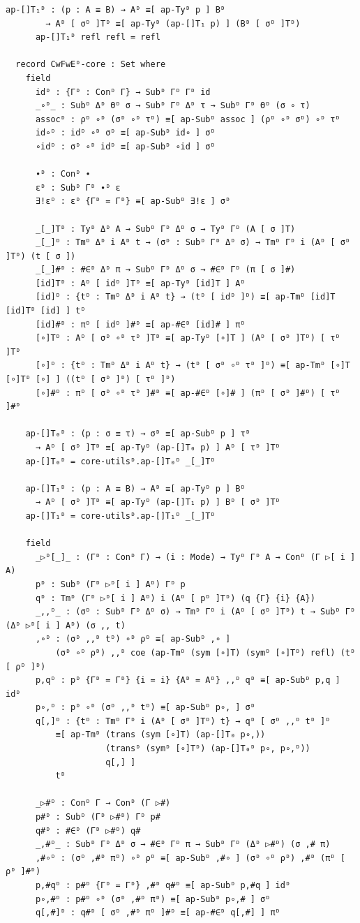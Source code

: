 \documentclass[10pt,a4paper]{article}
\theoremstyle{definition}
\theoremstyle{remark}
\begin{document}
{\begin{Verbatim}[breaklines=true,breakanywhere=true,fontsize=\scriptsize]
      ap-[]T₁ᴰ : (p : A ≡ B) → Aᴰ ≡[ ap-Tyᴰ p ] Bᴰ
        → Aᴰ [ σᴰ ]Tᴰ ≡[ ap-Tyᴰ (ap-[]T₁ p) ] (Bᴰ [ σᴰ ]Tᴰ)
      ap-[]T₁ᴰ refl refl = refl

  record CwFwEᴰ-core : Set where
    field
      idᴰ : {Γᴰ : Conᴰ Γ} → Subᴰ Γᴰ Γᴰ id
      _∘ᴰ_ : Subᴰ Δᴰ Θᴰ σ → Subᴰ Γᴰ Δᴰ τ → Subᴰ Γᴰ Θᴰ (σ ∘ τ)
      assocᴰ : ρᴰ ∘ᴰ (σᴰ ∘ᴰ τᴰ) ≡[ ap-Subᴰ assoc ] (ρᴰ ∘ᴰ σᴰ) ∘ᴰ τᴰ
      id∘ᴰ : idᴰ ∘ᴰ σᴰ ≡[ ap-Subᴰ id∘ ] σᴰ
      ∘idᴰ : σᴰ ∘ᴰ idᴰ ≡[ ap-Subᴰ ∘id ] σᴰ

      ∙ᴰ : Conᴰ ∙
      εᴰ : Subᴰ Γᴰ ∙ᴰ ε
      ∃!εᴰ : εᴰ {Γᴰ = Γᴰ} ≡[ ap-Subᴰ ∃!ε ] σᴰ

      _[_]Tᴰ : Tyᴰ Δᴰ A → Subᴰ Γᴰ Δᴰ σ → Tyᴰ Γᴰ (A [ σ ]T)
      _[_]ᴰ : Tmᴰ Δᴰ i Aᴰ t → (σᴰ : Subᴰ Γᴰ Δᴰ σ) → Tmᴰ Γᴰ i (Aᴰ [ σᴰ ]Tᴰ) (t [ σ ])
      _[_]#ᴰ : #∈ᴰ Δᴰ π → Subᴰ Γᴰ Δᴰ σ → #∈ᴰ Γᴰ (π [ σ ]#)
      [id]Tᴰ : Aᴰ [ idᴰ ]Tᴰ ≡[ ap-Tyᴰ [id]T ] Aᴰ
      [id]ᴰ : {tᴰ : Tmᴰ Δᴰ i Aᴰ t} → (tᴰ [ idᴰ ]ᴰ) ≡[ ap-Tmᴰ [id]T [id]Tᴰ [id] ] tᴰ
      [id]#ᴰ : πᴰ [ idᴰ ]#ᴰ ≡[ ap-#∈ᴰ [id]# ] πᴰ
      [∘]Tᴰ : Aᴰ [ σᴰ ∘ᴰ τᴰ ]Tᴰ ≡[ ap-Tyᴰ [∘]T ] (Aᴰ [ σᴰ ]Tᴰ) [ τᴰ ]Tᴰ
      [∘]ᴰ : {tᴰ : Tmᴰ Δᴰ i Aᴰ t} → (tᴰ [ σᴰ ∘ᴰ τᴰ ]ᴰ) ≡[ ap-Tmᴰ [∘]T [∘]Tᴰ [∘] ] ((tᴰ [ σᴰ ]ᴰ) [ τᴰ ]ᴰ)
      [∘]#ᴰ : πᴰ [ σᴰ ∘ᴰ τᴰ ]#ᴰ ≡[ ap-#∈ᴰ [∘]# ] (πᴰ [ σᴰ ]#ᴰ) [ τᴰ ]#ᴰ

    ap-[]T₀ᴰ : (p : σ ≡ τ) → σᴰ ≡[ ap-Subᴰ p ] τᴰ
      → Aᴰ [ σᴰ ]Tᴰ ≡[ ap-Tyᴰ (ap-[]T₀ p) ] Aᴰ [ τᴰ ]Tᴰ
    ap-[]T₀ᴰ = core-utilsᴰ.ap-[]T₀ᴰ _[_]Tᴰ

    ap-[]T₁ᴰ : (p : A ≡ B) → Aᴰ ≡[ ap-Tyᴰ p ] Bᴰ
      → Aᴰ [ σᴰ ]Tᴰ ≡[ ap-Tyᴰ (ap-[]T₁ p) ] Bᴰ [ σᴰ ]Tᴰ
    ap-[]T₁ᴰ = core-utilsᴰ.ap-[]T₁ᴰ _[_]Tᴰ

    field
      _▷ᴰ[_]_ : (Γᴰ : Conᴰ Γ) → (i : Mode) → Tyᴰ Γᴰ A → Conᴰ (Γ ▷[ i ] A)
      pᴰ : Subᴰ (Γᴰ ▷ᴰ[ i ] Aᴰ) Γᴰ p
      qᴰ : Tmᴰ (Γᴰ ▷ᴰ[ i ] Aᴰ) i (Aᴰ [ pᴰ ]Tᴰ) (q {Γ} {i} {A})
      _,,ᴰ_ : (σᴰ : Subᴰ Γᴰ Δᴰ σ) → Tmᴰ Γᴰ i (Aᴰ [ σᴰ ]Tᴰ) t → Subᴰ Γᴰ (Δᴰ ▷ᴰ[ i ] Aᴰ) (σ ,, t)
      ,∘ᴰ : (σᴰ ,,ᴰ tᴰ) ∘ᴰ ρᴰ ≡[ ap-Subᴰ ,∘ ]
          (σᴰ ∘ᴰ ρᴰ) ,,ᴰ coe (ap-Tmᴰ (sym [∘]T) (symᴰ [∘]Tᴰ) refl) (tᴰ [ ρᴰ ]ᴰ)
      p,qᴰ : pᴰ {Γᴰ = Γᴰ} {i = i} {Aᴰ = Aᴰ} ,,ᴰ qᴰ ≡[ ap-Subᴰ p,q ] idᴰ
      p∘,ᴰ : pᴰ ∘ᴰ (σᴰ ,,ᴰ tᴰ) ≡[ ap-Subᴰ p∘, ] σᴰ
      q[,]ᴰ : {tᴰ : Tmᴰ Γᴰ i (Aᴰ [ σᴰ ]Tᴰ) t} → qᴰ [ σᴰ ,,ᴰ tᴰ ]ᴰ
          ≡[ ap-Tmᴰ (trans (sym [∘]T) (ap-[]T₀ p∘,))
                    (transᴰ (symᴰ [∘]Tᴰ) (ap-[]T₀ᴰ p∘, p∘,ᴰ))
                    q[,] ]
          tᴰ

      _▷#ᴰ : Conᴰ Γ → Conᴰ (Γ ▷#)
      p#ᴰ : Subᴰ (Γᴰ ▷#ᴰ) Γᴰ p#
      q#ᴰ : #∈ᴰ (Γᴰ ▷#ᴰ) q#
      _,#ᴰ_ : Subᴰ Γᴰ Δᴰ σ → #∈ᴰ Γᴰ π → Subᴰ Γᴰ (Δᴰ ▷#ᴰ) (σ ,# π)
      ,#∘ᴰ : (σᴰ ,#ᴰ πᴰ) ∘ᴰ ρᴰ ≡[ ap-Subᴰ ,#∘ ] (σᴰ ∘ᴰ ρᴰ) ,#ᴰ (πᴰ [ ρᴰ ]#ᴰ)
      p,#qᴰ : p#ᴰ {Γᴰ = Γᴰ} ,#ᴰ q#ᴰ ≡[ ap-Subᴰ p,#q ] idᴰ
      p∘,#ᴰ : p#ᴰ ∘ᴰ (σᴰ ,#ᴰ πᴰ) ≡[ ap-Subᴰ p∘,# ] σᴰ
      q[,#]ᴰ : q#ᴰ [ σᴰ ,#ᴰ πᴰ ]#ᴰ ≡[ ap-#∈ᴰ q[,#] ] πᴰ


\end{Verbatim}}
\end{document}
